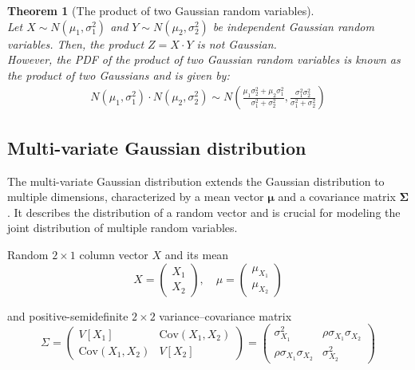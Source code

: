 \documentclass[11pt]{book} %
\newtheorem{theorem}{Theorem}[section]
\begin{document}
\begin{theorem}[The product of two Gaussian random variables]\ \\
    Let \(X \sim N(\mu_1, \sigma_1^2)\) and \(Y \sim N(\mu_2, \sigma_2^2)\) be independent Gaussian random variables. 
    Then, the product \(Z = X \cdot Y\) is not Gaussian. \\
    However, the PDF of the product of two Gaussian random variables is known as the \textit{product of two Gaussians} and is given by:
    \begin{align*}
        N\left( \mu_1, \sigma_1^2 \right) \cdot N\left( \mu_2, \sigma_2^2 \right) \sim
        N(\frac{\mu_1 \sigma_2^2 + \mu_2 \sigma_1^2}{\sigma_1^2 + \sigma_2^2}, \frac{\sigma_1^2 \sigma_2^2}{\sigma_1^2 + \sigma_2^2})
    \end{align*}
    
\end{theorem}

\newpage

\subsection{Multi-variate Gaussian distribution}

The multi-variate Gaussian distribution extends the Gaussian distribution to multiple dimensions, 
characterized by a mean vector \(\boldsymbol{\mu}\) and a covariance matrix \(\boldsymbol{\Sigma}\). 
It describes the distribution of a random vector and is crucial for modeling the joint distribution of multiple random variables.


Random $2 \times 1$ column vector $X$ and its mean
\[
X = \begin{pmatrix}
X_1 \\
X_2
\end{pmatrix},
\quad
\mu = \begin{pmatrix}
\mu_{X_1} \\
\mu_{X_2}
\end{pmatrix}
\]

and positive-semidefinite $2 \times 2$ variance--covariance matrix
\[
\Sigma = \begin{pmatrix}
V[X_1] & \text{Cov}(X_1, X_2) \\
\text{Cov}(X_1, X_2) & V[X_2]
\end{pmatrix}
= \begin{pmatrix}
\sigma_{X_1}^2 & \rho\sigma_{X_1}\sigma_{X_2} \\
\rho\sigma_{X_1}\sigma_{X_2} & \sigma_{X_2}^2
\end{pmatrix}
\]
\end{document}
